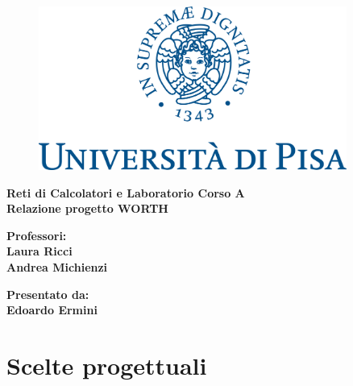 \documentclass[11pt]{report}
\begin{document}
	
	\begin{titlepage}
		
		\linespread{2}
		
		\begin{figure}[t]
			\centering\includegraphics[width=0.9\textwidth]{unipi_logo}
		\end{figure}
		
		\begin{center}
			\vspace*{5mm}
			{\LARGE{\bf Reti di Calcolatori e Laboratorio Corso A}}\\
			\vspace{5mm}
			{\LARGE{\bf Relazione progetto WORTH}}\\
		\end{center}
		
		\vspace{10mm}
		
		
		\vspace{30mm}
		
		\hfill
		\begin{minipage}[t]{0.47\textwidth}\raggedright
			{\large{\bf Professori: \\ Laura Ricci\\ Andrea Michienzi }}
		\end{minipage}
		\hfill
		\begin{minipage}[t]{0.47\textwidth}\raggedleft
			{\large{\bf Presentato da: \\ Edoardo Ermini\\ }}
		\end{minipage}
		
	\end{titlepage}

	\tableofcontents
	
	\chapter{Scelte progettuali}
	
\end{document}

